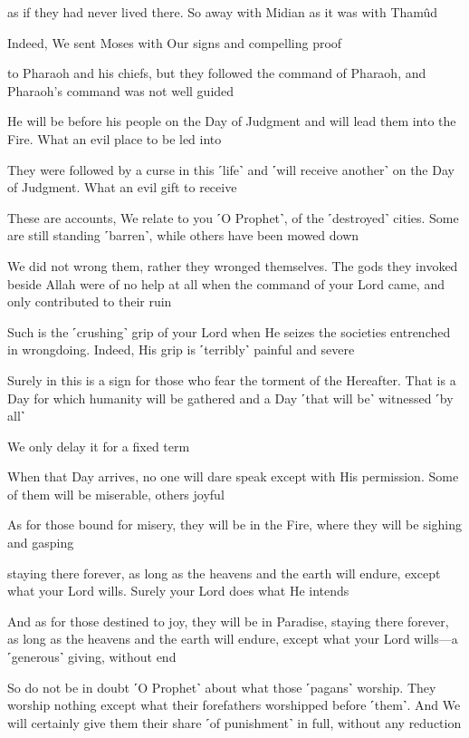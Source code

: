 as if they had never lived there. So away with Midian as it was with Thamûd

Indeed, We sent Moses with Our signs and compelling proof

to Pharaoh and his chiefs, but they followed the command of Pharaoh, and Pharaoh’s command was not well guided

He will be before his people on the Day of Judgment and will lead them into the Fire. What an evil place to be led into

They were followed by a curse in this ˹life˺ and ˹will receive another˺ on the Day of Judgment. What an evil gift to receive

These are accounts, We relate to you ˹O Prophet˺, of the ˹destroyed˺ cities. Some are still standing ˹barren˺, while others have been mowed down

We did not wrong them, rather they wronged themselves. The gods they invoked beside Allah were of no help at all when the command of your Lord came, and only contributed to their ruin

Such is the ˹crushing˺ grip of your Lord when He seizes the societies entrenched in wrongdoing. Indeed, His grip is ˹terribly˺ painful and severe

Surely in this is a sign for those who fear the torment of the Hereafter. That is a Day for which humanity will be gathered and a Day ˹that will be˺ witnessed ˹by all˺

We only delay it for a fixed term

When that Day arrives, no one will dare speak except with His permission. Some of them will be miserable, others joyful

As for those bound for misery, they will be in the Fire, where they will be sighing and gasping

staying there forever, as long as the heavens and the earth will endure, except what your Lord wills. Surely your Lord does what He intends

And as for those destined to joy, they will be in Paradise, staying there forever, as long as the heavens and the earth will endure, except what your Lord wills—a ˹generous˺ giving, without end

So do not be in doubt ˹O Prophet˺ about what those ˹pagans˺ worship. They worship nothing except what their forefathers worshipped before ˹them˺. And We will certainly give them their share ˹of punishment˺ in full, without any reduction

